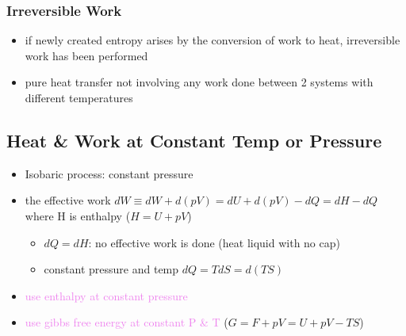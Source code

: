 \subsubsection{Irreversible Work}
\begin{itemize}
	\item if newly created entropy arises by the conversion of work to heat, irreversible
	      work has been performed
	\item pure heat transfer not involving any work done between 2 systems with different temperatures
\end{itemize}


\subsection{Heat \& Work at Constant Temp or Pressure}

\begin{itemize}
    \item Isobaric process: constant pressure 
    \item the effective work $dW \equiv dW + d(pV) = dU + d(pV) -dQ = dH - dQ$
    where H is enthalpy ($H = U + pV$)
    \begin{itemize}
        \item $dQ = dH$: no effective work is done (heat liquid with no cap)
        \item constant pressure and temp $dQ = T dS = d(TS)$
    \end{itemize}
    \item \textcolor{violet}{use enthalpy at constant pressure}
    \item \textcolor{violet}{use gibbs free energy at constant P \& T} ($G = F + pV = U +pV - TS$)
\end{itemize}

